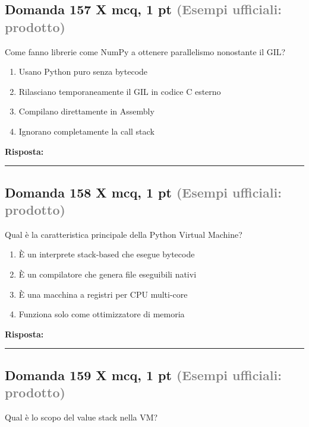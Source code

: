 \documentclass[a4paper,11pt]{article}
\begin{document}
\subsection*{Domanda 157 X \hfill {\small mcq, 1 pt \textcolor{gray}{(Esempi ufficiali: prodotto)}}}
Come fanno librerie come NumPy a ottenere parallelismo nonostante il GIL?

\begin{enumerate}[label=\alph*)]
\item Usano Python puro senza bytecode
\item Rilasciano temporaneamente il GIL in codice C esterno
\item Compilano direttamente in Assembly
\item Ignorano completamente la call stack
\end{enumerate}
\vspace{0.2cm}
\noindent\textbf{Risposta:}\par
\vspace{1.5cm}\hrule


\subsection*{Domanda 158 X \hfill {\small mcq, 1 pt \textcolor{gray}{(Esempi ufficiali: prodotto)}}}
Qual è la caratteristica principale della Python Virtual Machine?

\begin{enumerate}[label=\alph*)]
\item È un interprete stack-based che esegue bytecode
\item È un compilatore che genera file eseguibili nativi
\item È una macchina a registri per CPU multi-core
\item Funziona solo come ottimizzatore di memoria
\end{enumerate}
\vspace{0.2cm}
\noindent\textbf{Risposta:}\par
\vspace{1.5cm}\hrule


\subsection*{Domanda 159 X \hfill {\small mcq, 1 pt \textcolor{gray}{(Esempi ufficiali: prodotto)}}}
Qual è lo scopo del value stack nella VM?
\end{document}
